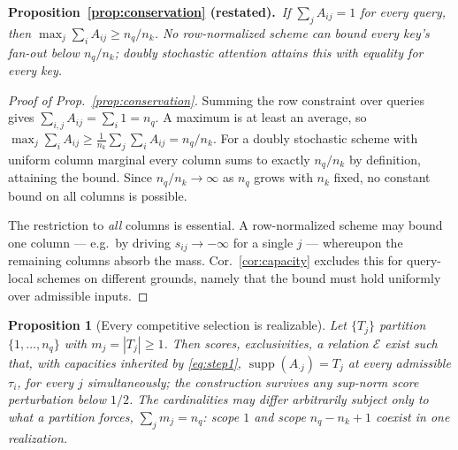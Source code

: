 \documentclass{article}
\newtheorem{proposition}{Proposition}
\newcommand{\supp}{\operatorname{supp}}
\begin{document}
\medskip\noindent\textbf{Proposition~\ref{prop:conservation} (restated).}\ \emph{If $\sum_j A_{ij}=1$ for every query, then $\max_j \sum_i A_{ij} \ge n_q/n_k$. No
row-normalized scheme can bound every key's fan-out below $n_q/n_k$; doubly stochastic attention
attains this with equality for every key.}

\begin{proof}[Proof of Prop.~\ref{prop:conservation}]
Summing the row constraint over queries gives $\sum_{i,j} A_{ij} = \sum_i 1 = n_q$. A maximum
is at least an average, so
$\max_j \sum_i A_{ij} \geq \frac{1}{n_k}\sum_j\sum_i A_{ij} = n_q/n_k$. For a doubly
stochastic scheme with uniform column marginal every column sums to exactly $n_q/n_k$ by
definition, attaining the bound. Since $n_q/n_k \to \infty$ as $n_q$ grows with $n_k$ fixed,
no constant bound on all columns is possible.

The restriction to \emph{all} columns is essential. A row-normalized scheme may bound one
column --- e.g.\ by driving $s_{ij}\to-\infty$ for a single $j$ --- whereupon the remaining
columns absorb the mass. Cor.~\ref{cor:capacity} excludes this for query-local schemes on
different grounds, namely that the bound must hold uniformly over admissible inputs.
\end{proof}

\begin{proposition}[Every competitive selection is realizable]
\label{prop:realizability}
Let $\{T_j\}$ partition $\{1,\dots,n_q\}$ with $m_j=|T_j|\ge1$. Then scores, exclusivities,
a relation $\mathcal{E}$ exist such that, with capacities inherited by \eqref{eq:step1},
$\supp(A_{\cdot j})=T_j$ at every admissible $\tau_i$, for every $j$
simultaneously; the construction survives any sup-norm score perturbation below $1/2$. The
cardinalities may differ arbitrarily subject only to what a partition forces,
$\sum_j m_j = n_q$: scope $1$ and scope $n_q-n_k+1$ coexist in one realization.
\end{proposition}
\end{document}
